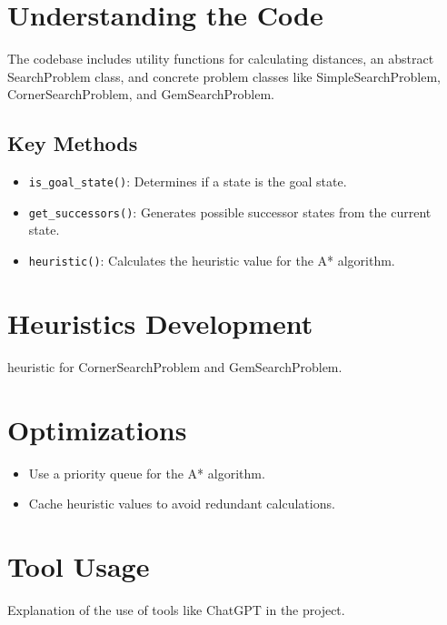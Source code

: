 \documentclass{article}
\begin{document}
\in




\section{Understanding the Code}

The codebase includes utility functions for calculating distances, an abstract SearchProblem class, and concrete problem classes like SimpleSearchProblem, CornerSearchProblem, and GemSearchProblem.

\subsection{Key Methods}
\begin{itemize}
    \item \texttt{is\_goal\_state()}: Determines if a state is the goal state.
    \item \texttt{get\_successors()}: Generates possible successor states from the current state.
    \item \texttt{heuristic()}: Calculates the heuristic value for the A* algorithm.
\end{itemize}



\section{Heuristics Development}
    heuristic for CornerSearchProblem and GemSearchProblem.

\section{Optimizations}
\begin{itemize}
    \item Use a priority queue for the A* algorithm.
    \item Cache heuristic values to avoid redundant calculations.
\end{itemize}

\section{Tool Usage}
Explanation of the use of tools like ChatGPT in the project.
\end{document}
